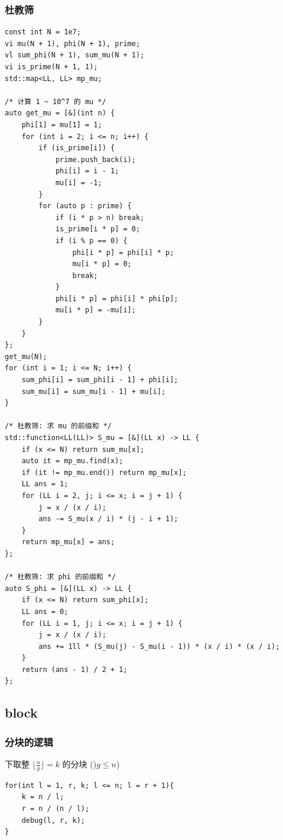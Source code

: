 \documentclass[UTF8, a4paper, titlepage, twoside]{ctexart}
\begin{document}
\subsubsection*{ 杜教筛 }
\begin{lstlisting}[style=cpp]
const int N = 1e7;
vi mu(N + 1), phi(N + 1), prime;
vl sum_phi(N + 1), sum_mu(N + 1);
vi is_prime(N + 1, 1);
std::map<LL, LL> mp_mu;

/* 计算 1 ~ 10^7 的 mu */
auto get_mu = [&](int n) {
    phi[1] = mu[1] = 1;
    for (int i = 2; i <= n; i++) {
        if (is_prime[i]) {
            prime.push_back(i);
            phi[i] = i - 1;
            mu[i] = -1;
        }
        for (auto p : prime) {
            if (i * p > n) break;
            is_prime[i * p] = 0;
            if (i % p == 0) {
                phi[i * p] = phi[i] * p;
                mu[i * p] = 0;
                break;
            }
            phi[i * p] = phi[i] * phi[p];
            mu[i * p] = -mu[i];
        }
    }
};
get_mu(N);
for (int i = 1; i <= N; i++) {
    sum_phi[i] = sum_phi[i - 1] + phi[i];
    sum_mu[i] = sum_mu[i - 1] + mu[i];
}

/* 杜教筛: 求 mu 的前缀和 */
std::function<LL(LL)> S_mu = [&](LL x) -> LL {
    if (x <= N) return sum_mu[x];
    auto it = mp_mu.find(x);
    if (it != mp_mu.end()) return mp_mu[x];
    LL ans = 1;
    for (LL i = 2, j; i <= x; i = j + 1) {
        j = x / (x / i);
        ans -= S_mu(x / i) * (j - i + 1);
    }
    return mp_mu[x] = ans;
};

/* 杜教筛: 求 phi 的前缀和 */
auto S_phi = [&](LL x) -> LL {
    if (x <= N) return sum_phi[x];
    LL ans = 0;
    for (LL i = 1, j; i <= x; i = j + 1) {
        j = x / (x / i);
        ans += 1ll * (S_mu(j) - S_mu(i - 1)) * (x / i) * (x / i);
    }
    return (ans - 1) / 2 + 1;
};
\end{lstlisting}

\subsection{ block }

\subsubsection*{ 分块的逻辑 }

下取整 $\lfloor \frac{n}{g} \rfloor = k$ 的分块 ()$g \leqslant n$)

\begin{lstlisting}[style=cpp]
for(int l = 1, r, k; l <= n; l = r + 1){
    k = n / l;
    r = n / (n / l);
    debug(l, r, k);
}
\end{lstlisting}
\end{document}
